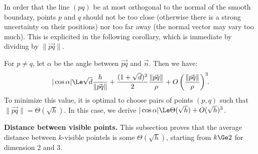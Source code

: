 {In order that the line $(pq)$ be at most orthogonal to the normal of the smooth boundary,}
points $p$ and $q$ should not be too close
(otherwise there is a strong uncertainty on their positions) nor too
far away (the normal vector may vary too much). This is explicited in
the following corollary, which is immediate by dividing
 by $\|\vec{pq}\|$.
\begin{corollary}
    \label{cor1}
    For $p \neq q$, let $\alpha$ be the angle between $\vec{pq}$ and $\vec{n}$. Then we have:
    \begin{align*}
        |\cos \alpha|
        \Le  \sqrt{d} \frac{h}{\|\vec{pq}\|} + \frac{(1+\sqrt{d})^2}{2}
        \frac{\|\vec{pq}\|}{\rho} + O\left(
                                         \frac{\|\vec{pq}\|}{\rho} \right)^3 \!\!.
    \end{align*}
    To minimize this value, it is optimal to choose pairs of points $(p,q)$ such that $\|\vec{pq}\|=\Theta(\sqrt{h})$. In this case, we derive $|\cos \alpha| \Le \Theta(\sqrt{h}) + O(\sqrt{h})^3$.
\end{corollary}

\noindent\textbf{Distance between visible points.}  This subsection
proves that the average distance between $k$-visible pointels is some
$\Theta(\sqrt{h})$, starting from $k\Ge 2$ for dimension 2 and 3.

